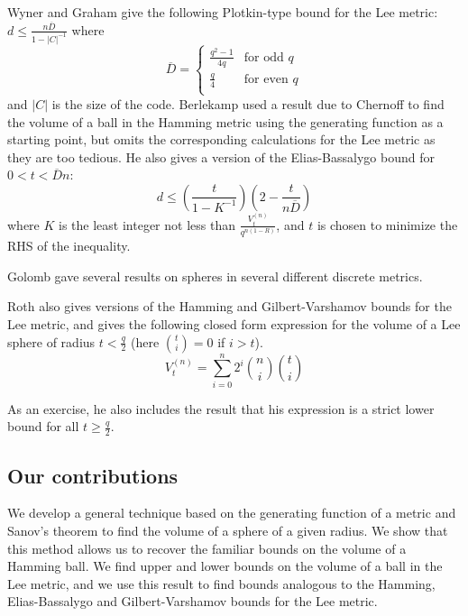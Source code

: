 \documentclass[conference,letterpaper]{IEEEtran}
\begin{document}
Wyner and Graham \cite{DBLP:journals/iandc/WynerG68} give the following Plotkin-type bound for the Lee metric:
$
    d \leq \frac{n \overline{D}}{1 - \lvert C \rvert^{-1}}
$
where 
\begin{equation}
    \overline{D} =  
    \begin{cases}
        \frac{q^2-1}{4q} & \text{for odd $q$}\\
        \frac{q}{4} & \text{for even $q$} \\
    \end{cases}
\end{equation}
and $\lvert C \rvert$ is the size of the code.
Berlekamp \cite{Berlekamp:2015:ACT:2834146} used a result due to Chernoff \cite{chernoff1952} to find the volume of a ball in the Hamming metric using the generating function as a starting point, but omits the corresponding calculations for the Lee metric as they are too tedious. He also gives a version of the Elias-Bassalygo bound for $0 < t < \overline{D}n$:
\begin{equation}
    d \leq \left(\frac{t}{1-K^{-1}}\right)\left(2 - \frac{t}{n\overline{D}}\right)
\end{equation}
where $K$ is the least integer not less than $\frac{V_t^{(n)}}{q^{n(1-R)}}$, and $t$ is chosen to minimize the RHS of the inequality.

Golomb \cite{golomb} gave several results on spheres in several different discrete metrics.

Roth \cite{Roth:2006:ICT:1137784} also gives versions of the Hamming and Gilbert-Varshamov bounds for the Lee metric, and gives the following closed form expression for the volume of a Lee sphere of radius $t < \frac{q}{2}$ (here $\binom{t}{i} = 0$ if $i > t$).
\begin{equation}
    V_{t}^{(n)} = \sum_{i = 0}^{n}2^i \binom{n}{i} \binom{t}{i}
\end{equation}

As an exercise, he also includes the result that his expression is a strict lower bound for all $t \geq \frac{q}{2}$.

\subsection{Our contributions}
We develop a general technique based on the generating function of a metric and Sanov's theorem to find the volume of a sphere of a given radius. We show that this method allows us to recover the familiar bounds on the volume of a Hamming ball. We find upper and lower bounds on the volume of a ball in the Lee metric, and we use this result to find bounds analogous to the Hamming, Elias-Bassalygo and Gilbert-Varshamov bounds for the Lee metric.
\end{document}

